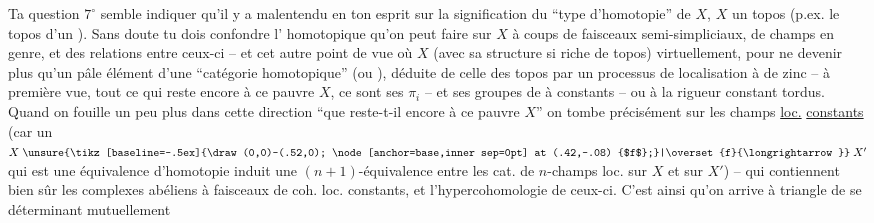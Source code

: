 
Ta question $7^{\circ}$ semble indiquer qu'il y a malentendu en ton esprit sur la signification du ``type d'homotopie'' de $X$, $X$ un topos (p.ex. le topos  d'un ). Sans doute tu dois confondre l' homotopique qu'on peut faire sur $X$ à coups de faisceaux semi-simpliciaux, de champs en  genre, et des relations entre ceux-ci -- et cet autre point de vue où $X$ (avec sa structure si riche de topos)  virtuellement,
pour ne devenir plus qu'un pâle élément d'une ``catégorie homotopique'' (ou ), déduite de celle des topos par un processus de localisation à  de zinc -- à première vue, tout ce qui reste encore à ce pauvre $X$, ce sont ses $\pi_i$ -- et ses groupes de  à  constants -- ou à la rigueur constant tordus. Quand on fouille un peu plus dans cette direction ``que reste-t-il encore à ce pauvre $X$'' on tombe précisément sur les champs \uline{loc.} \uline{constants} (car un $X\mathrel{\unsure{\tikz[baseline=-.5ex]{\draw (0,0)--(.52,0); \node[anchor=base,inner sep=0pt] at (.42,-.08) {$f$};}|\overset{f}{\longrightarrow}}}X'$ qui est une équivalence d'homotopie induit une $(n+1)$-équivalence entre les cat. de $n$-champs loc.  sur $X$ et sur $X'$) -- qui contiennent bien sûr les complexes  abéliens  à faisceaux de coh. loc. constants, et l'hypercohomologie de ceux-ci. C'est ainsi qu'on arrive à   triangle de  se déterminant mutuellement
